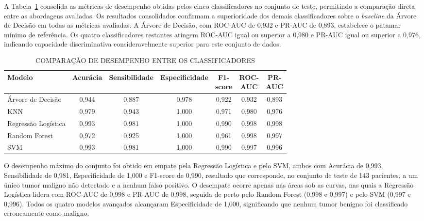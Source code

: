 \documentclass[
    12pt
    ,oneside
    ,a4paper
    ,chapter=TITLE
    ,section=TITLE
    ,sumario=abnt-6027-2012
    ,english,brazil]{abntex2} %
\begin{document}
A Tabela~\ref{tab:comparacao_modelos} consolida as métricas de desempenho
obtidas pelos cinco classificadores no conjunto de teste, permitindo a
comparação direta entre as abordagens avaliadas. Os resultados consolidados confirmam
a superioridade dos demais classificadores sobre o \textit{baseline} da Árvore
de Decisão em todas as métricas avaliadas. A Árvore
de Decisão, com ROC-AUC de 0,932 e PR-AUC de 0,893, estabelece o patamar
mínimo de referência. Os quatro classificadores restantes atingem ROC-AUC igual
ou superior a 0,980 e PR-AUC igual ou superior a 0,976, indicando capacidade
discriminativa consideravelmente superior para este conjunto de dados.

\begin{table}[htbp]
    \centering
    \caption{COMPARAÇÃO DE DESEMPENHO ENTRE OS CLASSIFICADORES}
    \label{tab:comparacao_modelos}
    \setlength{\tabcolsep}{3pt}%
    \begin{tabular}{@{}lcccccc@{}}
        \toprule
        \textbf{Modelo} &
        \textbf{Acurácia} &
        \textbf{Sensibilidade} &
        \textbf{Especificidade} &
        \makecell{\textbf{F1-}\\\textbf{score}} &
        \makecell{\textbf{ROC-}\\\textbf{AUC}} &
        \makecell{\textbf{PR-}\\\textbf{AUC}} \\
        \midrule
        Árvore de Decisão   & 0,944 & 0,887 & 0,978 & 0,922 & 0,932 & 0,893 \\
        KNN                 & 0,979 & 0,943 & 1,000 & 0,971 & 0,980 & 0,976 \\
        Regressão Logística & 0,993 & 0,981 & 1,000 & 0,990 & 0,998 & 0,998 \\
        Random Forest       & 0,972 & 0,925 & 1,000 & 0,961 & 0,998 & 0,997 \\
        SVM                 & 0,993 & 0,981 & 1,000 & 0,990 & 0,997 & 0,996 \\
        \bottomrule
    \end{tabular}
    \vspace{0.2cm}
    \fonteautor
\end{table}

O desempenho máximo do conjunto foi obtido em empate pela Regressão Logística e
pelo SVM, ambos com Acurácia de 0,993, Sensibilidade de 0,981, Especificidade
de 1,000 e F1-score de 0,990, resultado que corresponde, no conjunto de teste
de 143 pacientes, a um único tumor maligno não detectado e a nenhum falso
positivo. O desempate ocorre apenas nas áreas sob as curvas, nas quais a
Regressão Logística lidera com ROC-AUC de 0,998 e PR-AUC de 0,998, seguida de
perto pelo Random Forest (0,998 e 0,997) e pelo SVM (0,997 e 0,996). Todos os
quatro modelos avançados alcançaram Especificidade de 1,000, significando que
nenhum tumor benigno foi classificado erroneamente como maligno.
\end{document}
